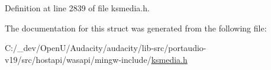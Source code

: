 Definition at line 2839 of file ksmedia.\+h.



The documentation for this struct was generated from the following file\+:\begin{DoxyCompactItemize}
\item 
C\+:/\+\_\+dev/\+Open\+U/\+Audacity/audacity/lib-\/src/portaudio-\/v19/src/hostapi/wasapi/mingw-\/include/\hyperlink{ksmedia_8h}{ksmedia.\+h}\end{DoxyCompactItemize}

